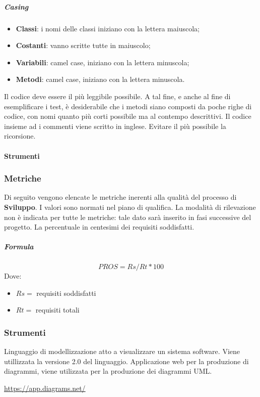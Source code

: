 	    \subparagraph{Casing}
	    \begin{itemize}
	        \item \textbf{Classi}: i nomi delle classi iniziano con la lettera maiuscola;
	        \item \textbf{Costanti}: vanno scritte tutte in maiuscolo;
	        \item \textbf{Variabili}: camel case, iniziano con la lettera minuscola;
	        \item \textbf{Metodi}: camel case, iniziano con la lettera minuscola.
	    \end{itemize}
	    Il codice deve essere il più leggibile possibile. A tal fine, e anche al fine di esemplificare i test, è desiderabile che i metodi siano composti da poche righe di codice, con nomi quanto più corti possibile ma al contempo descrittivi.
	    Il codice insieme ad i commenti viene scritto in inglese.
	    Evitare il più possibile la ricorsione.
\paragraph{Strumenti}
        \subsubsection{Metriche}
        Di seguito vengono elencate le metriche inerenti alla qualità del processo di \textbf{Sviluppo}. I valori sono normati nel piano di qualifica. La modalità di rilevazione non è indicata per tutte le metriche: tale dato sarà 
        inserito in fasi successive del progetto.
        La percentuale in centesimi dei requisiti soddisfatti.
        \subparagraph{Formula}
        \begin{displaymath}
         PROS = Rs / Rt *100
        \end{displaymath}
        Dove:
        \begin{itemize}
            \item[] $Rs =$ requisiti soddisfatti
            \item[] $Rt =$ requisiti totali
        \end{itemize}
        
        \subsubsection{Strumenti}
	    Linguaggio di modellizzazione atto a visualizzare un sistema software. Viene utillizzata la versione 2.0 del linguaggio.
	    Applicazione web per la produzione di diagrammi, viene utilizzata per la produzione dei diagrammi UML.\\
	    \centerline{\url{https://app.diagrams.net/}}